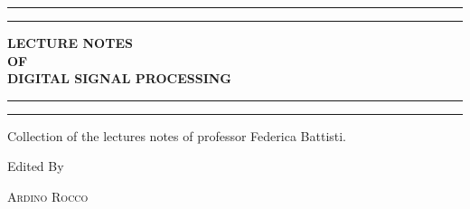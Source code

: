 \begin{titlepage} %

	\centering %

	\scshape %

	\vspace*{\baselineskip} %


	\rule{\textwidth}{1.6pt}\vspace*{-\baselineskip}\vspace*{2pt} %
	\rule{\textwidth}{0.4pt} %

	\vspace{0.75\baselineskip} %

	\textbf{\LARGE LECTURE NOTES\\ OF\\ DIGITAL SIGNAL PROCESSING \\} %

	\vspace{0.75\baselineskip} %

	\rule{\textwidth}{0.4pt}\vspace*{-\baselineskip}\vspace{3.2pt} %
	\rule{\textwidth}{1.6pt} %

	\vspace{2\baselineskip} %

	Collection of the lectures notes of professor Federica Battisti.

	\vspace*{3\baselineskip} %


	Edited By

	\vspace{0.5\baselineskip} %

	{\scshape\Large Ardino Rocco \\} %


\end{titlepage}
